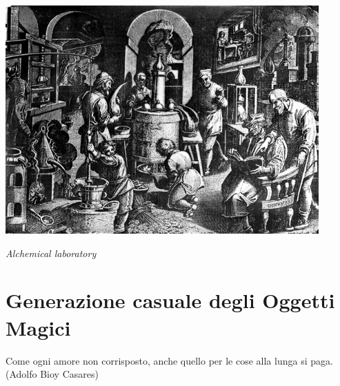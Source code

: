 \vfill

\begin{center}
\includegraphics[keepaspectratio,width=0.90\textwidth]{immagini/Alchemical_laboratory_Wellcome_M0005193.png}

\textit{Alchemical laboratory}
\end{center}

\pagebreak


\section{Generazione casuale degli Oggetti Magici}\label{generazionetesorimagici}\hypertarget{generazionetesorimagici}{}

\begin{changemargin}{0.3cm}{0.3cm}\begin{enfasi}
{Come ogni amore non corrisposto, anche quello per le cose alla lunga si paga. (Adolfo Bioy Casares)}
\end{enfasi}\end{changemargin}\medskip

